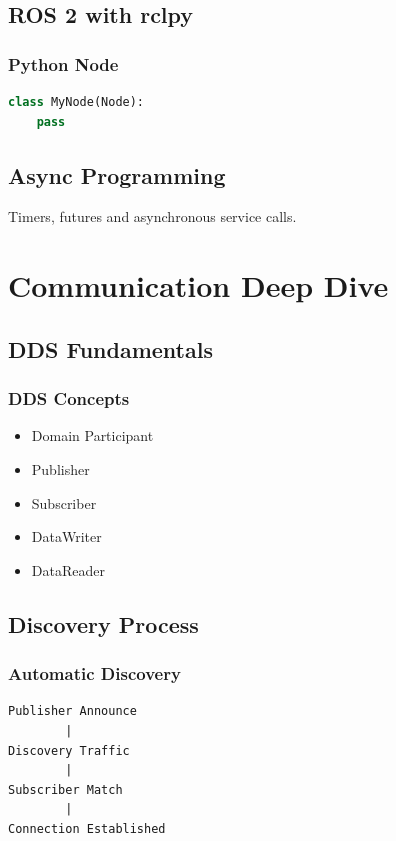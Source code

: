 \documentclass[11pt,oneside]{book}
\begin{document}
\chapter{ROS 2 with rclpy}

\section{Python Node}

\begin{lstlisting}[language=Python]
class MyNode(Node):
    pass
\end{lstlisting}

\chapter{Async Programming}

Timers, futures and asynchronous service calls.

\part{Communication Deep Dive}

\chapter{DDS Fundamentals}

\section{DDS Concepts}

\begin{itemize}
\item Domain Participant
\item Publisher
\item Subscriber
\item DataWriter
\item DataReader
\end{itemize}

\chapter{Discovery Process}

\section{Automatic Discovery}

\begin{verbatim}
Publisher Announce
        |
Discovery Traffic
        |
Subscriber Match
        |
Connection Established
\end{verbatim}
\end{document}
